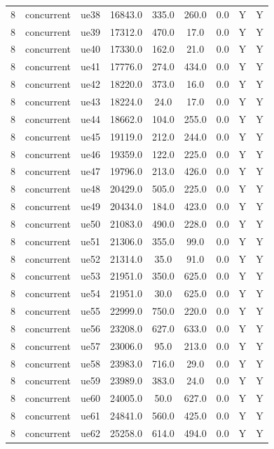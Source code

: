 \begin{table}[ht]
\begin{tabular}{|c|c|c|c|c|c|c|c|c|}
8 & concurrent & ue38 & 16843.0 & 335.0 & 260.0 & 0.0 & Y & Y \\
8 & concurrent & ue39 & 17312.0 & 470.0 & 17.0 & 0.0 & Y & Y \\
8 & concurrent & ue40 & 17330.0 & 162.0 & 21.0 & 0.0 & Y & Y \\
8 & concurrent & ue41 & 17776.0 & 274.0 & 434.0 & 0.0 & Y & Y \\
8 & concurrent & ue42 & 18220.0 & 373.0 & 16.0 & 0.0 & Y & Y \\
8 & concurrent & ue43 & 18224.0 & 24.0 & 17.0 & 0.0 & Y & Y \\
8 & concurrent & ue44 & 18662.0 & 104.0 & 255.0 & 0.0 & Y & Y \\
8 & concurrent & ue45 & 19119.0 & 212.0 & 244.0 & 0.0 & Y & Y \\
8 & concurrent & ue46 & 19359.0 & 122.0 & 225.0 & 0.0 & Y & Y \\
8 & concurrent & ue47 & 19796.0 & 213.0 & 426.0 & 0.0 & Y & Y \\
8 & concurrent & ue48 & 20429.0 & 505.0 & 225.0 & 0.0 & Y & Y \\
8 & concurrent & ue49 & 20434.0 & 184.0 & 423.0 & 0.0 & Y & Y \\
8 & concurrent & ue50 & 21083.0 & 490.0 & 228.0 & 0.0 & Y & Y \\
8 & concurrent & ue51 & 21306.0 & 355.0 & 99.0 & 0.0 & Y & Y \\
8 & concurrent & ue52 & 21314.0 & 35.0 & 91.0 & 0.0 & Y & Y \\
8 & concurrent & ue53 & 21951.0 & 350.0 & 625.0 & 0.0 & Y & Y \\
8 & concurrent & ue54 & 21951.0 & 30.0 & 625.0 & 0.0 & Y & Y \\
8 & concurrent & ue55 & 22999.0 & 750.0 & 220.0 & 0.0 & Y & Y \\
8 & concurrent & ue56 & 23208.0 & 627.0 & 633.0 & 0.0 & Y & Y \\
8 & concurrent & ue57 & 23006.0 & 95.0 & 213.0 & 0.0 & Y & Y \\
8 & concurrent & ue58 & 23983.0 & 716.0 & 29.0 & 0.0 & Y & Y \\
8 & concurrent & ue59 & 23989.0 & 383.0 & 24.0 & 0.0 & Y & Y \\
8 & concurrent & ue60 & 24005.0 & 50.0 & 627.0 & 0.0 & Y & Y \\
8 & concurrent & ue61 & 24841.0 & 560.0 & 425.0 & 0.0 & Y & Y \\
8 & concurrent & ue62 & 25258.0 & 614.0 & 494.0 & 0.0 & Y & Y \\

\end{tabular}
\end{table}
